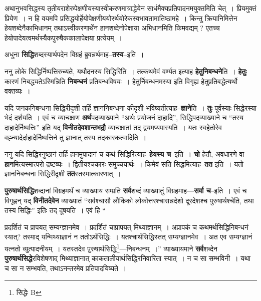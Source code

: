 \documentclass[article,12pt,a4paper]{memoir}
\begin{document}
	  \pstart अथानुभवसिद्धस्य तृतीयराशेरुपेक्षणीयस्यास्वीकरणमात्राद्धेयेन सार्धमैक्यप्रतिपादनमयुक्तमिति चेत् । प्रियमुक्तं प्रियेण । न हि वयमपि प्रसिद्धयोर्हेयोपेक्षणीययोरर्थयोरेकस्वभावतामातिष्ठामहे । किन्तु क्रियानिमित्तेन हेयशब्देनैकाभिधानम् तथाऽस्वीकरणार्थेन हानशब्देनोपेक्षाया अभिधानमिति किमवद्यम् ? एतच्च हेयोपादेयत्वमर्थस्यैकपुरुषैककालापेक्षया प्रत्येयम् ।
	\pend
      

	  \pstart अधुना \textbf{सिद्धि}शब्दस्यार्थपदेन विग्रहं ब्रुवन्नर्थमाह--\textbf{तस्य}--इति ।
	\pend
      

	  \pstart ननु लोके सिद्धिर्निष्पत्तिरुच्यते, यथौदनस्य सिद्धिरिति । तत्कथमेवं वर्ण्यत इत्याह \textbf{हेतुनिबन्धने}ति । \textbf{हेतुः} कारणं निबद्ध्यतेऽस्मिन्निति \textbf{निबन्धनं} प्रतिबन्धविषयः । हेतुर्निबन्धनमस्या इति विगृह्य हेतुप्रतिबद्धेत्यर्थो वक्तव्यः ।
	\pend
      

	  \pstart यदि जनकनिबन्धना सिद्धिरीदृशी तर्हि ज्ञाननिबन्धना कीदृशी भविष्यतीत्याह--\textbf{ज्ञाने}ति । \textbf{तुः} पूर्वस्याः सिद्धेरस्या भेदं दर्शयति । एवं च व्याचक्षाण \textbf{अर्थ}पदव्याख्याने “अर्थः प्रयोजनं दाहादि”, सिद्धिपदव्याख्याने च “तस्य दाहादेर्निष्पत्तिः” इति यद् \textbf{विनीतदेवशान्तभद्रौ} व्याचक्षातां तद् द्वयमप्यपास्यति । यतः स्वहेतोरेव वह्न्यादेर्दाहादेर्निष्पत्तिर्न तु ज्ञानात् तस्य तदकारकत्वादिति ।
	\pend
      

	  \pstart ननु यदि सिद्धिरनुष्ठानं तर्हि हानमुपादानं च कथं सिद्धिरित्याह--\textbf{हेयस्य च}--इति । \textbf{चो} हेतौ, अवधारणे वा \textbf{हान}मित्यस्मात्परो द्रष्टव्यः । द्वितीयश्चकारः समुच्चयार्थः । किमेवं सति सिद्धमित्याह--\textbf{तत} इति । यतो ज्ञाननिबन्धना सिद्धिरीदृशी \textbf{तत}स्तस्मात्कारणात् ।
	\pend
      

	  \pstart \textbf{पुरुषार्थसिद्धि}शब्दानां विग्रहमर्थं च व्याख्याय सम्प्रति \textbf{सर्व}शब्दं व्याख्यातुं विग्रहमाह—\textbf{सर्वा च}--इति । एवं च विगृह्णन् यद् \textbf{विनीतदेवेन} व्याख्यातं “सर्वश्चासौ लौकिको लोकोत्तरश्चासन्नदेशो दूरदेशश्च पुरुषार्थश्चेति, तथा तस्य सिद्धिः” इतिः तद् दूषयति । एवं हि  \leavevmode{} “
	  
	प्रदर्शितं च प्रापयत् सम्यग्ज्ञानमेव । प्रदर्शितं चाप्रापयत् मिथ्याज्ञानम् । अप्रापकं च कथमर्थसिद्धिनिबन्धनं स्यात्? तस्माद् यन्मिथ्याज्ञानं न ततोऽर्थसिद्धिः । यतश्चार्थसिद्धिस्तत् सम्यग्ज्ञानमेव । अत एव सम्यग्ज्ञानं यत्नतो व्युत्पादनीयम् । यतस्तदेव पुरुषार्थसिद्धि\footnote{सिद्धेः B}\-—निबन्धनम् ।” व्याख्यायमाने \textbf{सर्व}शब्देन \textbf{पुरुषार्थसिद्धे}रविशेषणाद् मिथ्याज्ञानात् काकतालीयार्थसिद्धिरनिवारिता स्यात् । न च सा सम्भविनी । यथा च सा न सम्भवति, तथाऽनन्तरमेव प्रतिपादयिष्यते ।
	\pend
      
\end{document}
